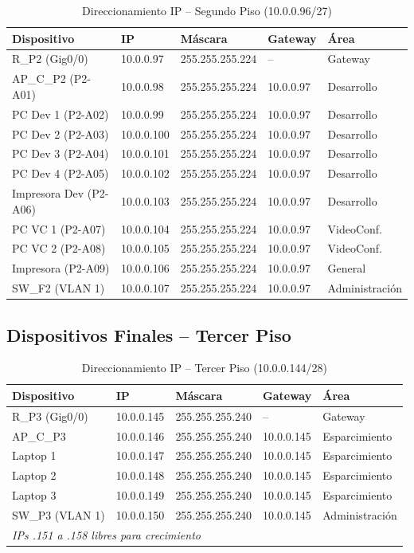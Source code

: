 \documentclass[letterpaper,11pt]{article}
\begin{document}
\begin{table}[H]
\centering
\caption{Direccionamiento IP -- Segundo Piso (10.0.0.96/27)}
\small
\begin{tabular}{|l|l|l|l|l|}
\hline
\textbf{Dispositivo} & \textbf{IP} & \textbf{Máscara} & \textbf{Gateway} & \textbf{Área} \\
\hline
R\_P2 (Gig0/0) & 10.0.0.97 & 255.255.255.224 & -- & Gateway \\
AP\_C\_P2 (P2-A01) & 10.0.0.98 & 255.255.255.224 & 10.0.0.97 & Desarrollo \\
PC Dev 1 (P2-A02) & 10.0.0.99 & 255.255.255.224 & 10.0.0.97 & Desarrollo \\
PC Dev 2 (P2-A03) & 10.0.0.100 & 255.255.255.224 & 10.0.0.97 & Desarrollo \\
PC Dev 3 (P2-A04) & 10.0.0.101 & 255.255.255.224 & 10.0.0.97 & Desarrollo \\
PC Dev 4 (P2-A05) & 10.0.0.102 & 255.255.255.224 & 10.0.0.97 & Desarrollo \\
Impresora Dev (P2-A06) & 10.0.0.103 & 255.255.255.224 & 10.0.0.97 & Desarrollo \\
PC VC 1 (P2-A07) & 10.0.0.104 & 255.255.255.224 & 10.0.0.97 & VideoConf. \\
PC VC 2 (P2-A08) & 10.0.0.105 & 255.255.255.224 & 10.0.0.97 & VideoConf. \\
Impresora (P2-A09) & 10.0.0.106 & 255.255.255.224 & 10.0.0.97 & General \\
SW\_F2 (VLAN 1) & 10.0.0.107 & 255.255.255.224 & 10.0.0.97 & Administración \\
\hline
\end{tabular}
\end{table}

\subsection{Dispositivos Finales -- Tercer Piso}

\begin{table}[H]
\centering
\caption{Direccionamiento IP -- Tercer Piso (10.0.0.144/28)}
\small
\begin{tabular}{|l|l|l|l|l|}
\hline
\textbf{Dispositivo} & \textbf{IP} & \textbf{Máscara} & \textbf{Gateway} & \textbf{Área} \\
\hline
R\_P3 (Gig0/0) & 10.0.0.145 & 255.255.255.240 & -- & Gateway \\
AP\_C\_P3 & 10.0.0.146 & 255.255.255.240 & 10.0.0.145 & Esparcimiento \\
Laptop 1 & 10.0.0.147 & 255.255.255.240 & 10.0.0.145 & Esparcimiento \\
Laptop 2 & 10.0.0.148 & 255.255.255.240 & 10.0.0.145 & Esparcimiento \\
Laptop 3 & 10.0.0.149 & 255.255.255.240 & 10.0.0.145 & Esparcimiento \\
SW\_P3 (VLAN 1) & 10.0.0.150 & 255.255.255.240 & 10.0.0.145 & Administración \\
\hline
\multicolumn{5}{|l|}{\textit{IPs .151 a .158 libres para crecimiento}} \\
\hline
\end{tabular}
\end{table}
\end{document}
